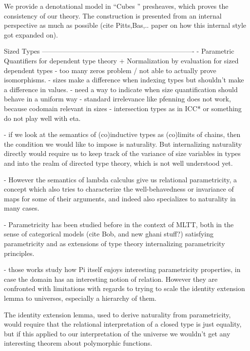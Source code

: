      We provide a denotational model in ``Cubes \times \omega''
     presheaves, which proves the consistency of our theory. The construction is presented from an internal
     perspective as much as possible (cite Pitts,Bas,.. paper on how this internal style got expanded on).

  Sized Types   
  -------------------------------------------------------------------
  - Parametric Quantifiers for dependent type theory + Normalization by evaluation for sized dependent types
    - too many zeros problem / not able to actually prove isomorphisms.
    - sizes make a difference when indexing types but shouldn't make a difference in values.
    - need a way to indicate when size quantification should behave in a uniform way
      - standard irrelevance like pfenning does not work, because codomain relevant in sizes
      - intersection types as in ICC* or something do not play well with eta.
      
    - if we look at the semantics of (co)inductive types as (co)limits
    of chains, then the condition we would like to impose is
    naturality. But internalizing naturality directly would require us
    to keep track of the variance of size variables in types and into
    the realm of directed type theory, which is not well understood
    yet.
    
    - However the semantics of lambda calculus give us relational
    parametricity, a concept which also tries to characterize the
    well-behavedness or invariance of maps for some of their
    arguments, and indeed also specializes to naturality in many cases.

    - Parametricity has been studied before in the context of MLTT,
    both in the sense of categorical models (cite Bob, and new ghani
    stuff?) satisfying parametricity and as extensions of type theory
    internalizing parametricity principles.

    - those works study how Pi itself enjoys interesting parametricity
    properties, in case the domain has an interesting notion of
    relation. However they are confronted with limitations with
    regards to trying to scale the identity extension lemma to
    universes, especially a hierarchy of them.

    The identity extension lemma, used to derive naturality from
    parametricity, would require that the relational interpretation of
    a closed type is just equality, but if this applied to our
    interpretation of the universe we wouldn't get any interesting
    theorem about polymorphic functions.

